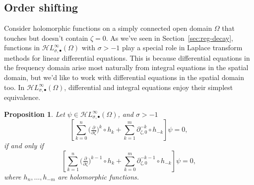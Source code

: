 \documentclass{article}
\newcommand{\singexp}[2]{\mathcal{H}L^\infty_{#1, #2}}
\newcommand{\singexpalg}[1]{\singexp{#1}{\bullet}}
\newcommand{\Z}{\mathbb{Z}}
\newcommand{\R}{\mathbb{R}}
\newcommand{\fracderiv}[3]{\partial^{#1}_{#2, #3}}
\theoremstyle{definition}
\theoremstyle{plain}
\newtheorem{prop}[definition]{Proposition}
\begin{document}
{\subsection{Order shifting}\label{shifting}
Consider holomorphic functions on a simply connected open domain $\Omega$ that touches but doesn't contain $\zeta = 0$. %
As we've seen in Section~\ref{sec:reg-decay}, functions in $\singexpalg{\sigma}(\Omega)$ with $\sigma>-1$ play a special role in Laplace transform methods for linear differential equations. This is because differential equations in the frequency domain arise most naturally from integral equations in the spatial domain, but we'd like to work with differential equations in the spatial domain too. In $\singexpalg{\sigma}(\Omega)$, differential and integral equations enjoy their simplest equivalence.
\begin{prop}\label{prop:shifting}
Let $\psi\in\singexpalg{\sigma}(\Omega)$, and $\sigma>-1$
\[ \left[ \sum_{k = 0}^n \big(\tfrac{\partial}{\partial \zeta}\big)^k \circ h_k + \sum_{k = 1}^m \fracderiv{-k}{\zeta}{0} \circ h_{-k} \right] \psi = 0, \]
if and only if
\[ \left[ \sum_{k = 1}^n \big(\tfrac{\partial}{\partial \zeta}\big)^{k-1} \circ h_k + \sum_{k = 0}^m \fracderiv{-k-1}{\zeta}{0} \circ h_{-k} \right] \psi = 0, \]
where $h_n, \ldots, h_{-m}$ are holomorphic functions.
\end{prop}



}
\end{document}
